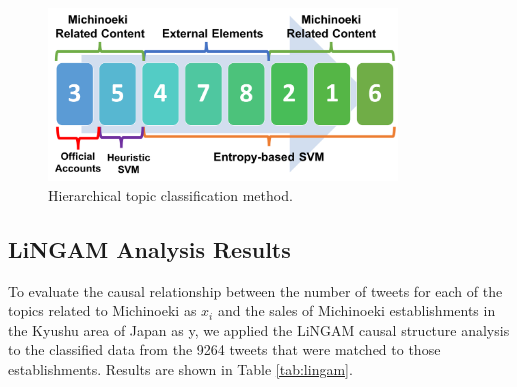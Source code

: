 \documentclass[review]{elsarticle}
\begin{document}
\begin{figure}[htp]
\centering
\includegraphics[width=25em]{hierarchical.png}
\caption{Hierarchical topic classification method.}
\label{fig:hierarchical}
\end{figure}

\subsection{LiNGAM Analysis Results}\label{res_lingam}

To evaluate the causal relationship between the number of tweets for each of the topics related to Michinoeki as \(x_i\) and the sales of Michinoeki establishments in the Kyushu area of Japan as y, we applied the LiNGAM causal structure analysis to the classified data from the \num[group-separator={,}]{9264} tweets that were matched to those establishments. Results are shown in Table \ref{tab:lingam}.
\end{document}
